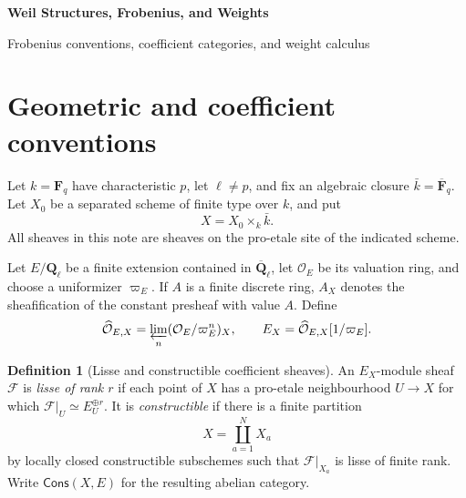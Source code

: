 \documentclass[10pt]{article}
\theoremstyle{definition}
\newtheorem{definition}[theorem]{Definition}
\newcommand{\Fq}{\mathbf F_q}
\newcommand{\Fbar}{\overline{\mathbf F}_q}
\newcommand{\Ql}{\mathbf Q_\ell}
\newcommand{\Qlb}{\overline{\mathbf Q}_\ell}
\begin{document}
\begin{center}
{\large\bfseries Weil Structures, Frobenius, and Weights\par}
\medskip
{\normalsize Frobenius conventions, coefficient categories, and weight calculus\par}
\end{center}

\begin{abstract}
This note defines every Frobenius and weight datum used in the cohomological
Weil conjectures.  It distinguishes arithmetic field Frobenius, geometric
field Frobenius, and scheme Frobenius; constructs the derived Weil category
by localizing strict equivariant complexes; and constructs algebraically
closed coefficients from finite coefficient fields.  Punctual purity,
mixedness, the BBD upper and lower predicates, scalar and base-field change,
and the monodromy filtration are then stated as a sequence of definitions
and theorems.  All derived categories are ordinary triangulated categories.
\end{abstract}
\tableofcontents

\section{Geometric and coefficient conventions}

Let \(k=\Fq\) have characteristic \(p\), let \(\ell\ne p\), and fix an
algebraic closure \(\bar k=\Fbar\).  Let \(X_0\) be a separated scheme of
finite type over \(k\), and put
\[
                         X=X_0\times_k\bar k.
\]
All sheaves in this note are sheaves on the pro-etale site of the indicated
scheme.

Let \(E/\Ql\) be a finite extension contained in \(\Qlb\), let
\(\mathcal O_E\) be its valuation ring, and choose a uniformizer
\(\varpi_E\).  If \(A\) is a finite discrete ring, \(A_X\) denotes the
sheafification of the constant presheaf with value \(A\).  Define
\[
 \widehat{\mathcal O}_{E,X}
   =\varprojlim_n(\mathcal O_E/\varpi_E^n)_X,
 \qquad
 E_X=\widehat{\mathcal O}_{E,X}[1/\varpi_E].
\]

\begin{definition}[Lisse and constructible coefficient sheaves]
An \(E_X\)-module sheaf \(\mathcal F\) is \emph{lisse of rank \(r\)} if
each point of \(X\) has a pro-etale neighbourhood \(U\to X\) for which
\(\mathcal F|_U\simeq E_U^{\oplus r}\).  It is \emph{constructible} if
there is a finite partition
\[
                       X=\coprod_{a=1}^N X_a
\]
by locally closed constructible subschemes such that
\(\mathcal F|_{X_a}\) is lisse of finite rank.  Write
\(\mathsf{Cons}(X,E)\) for the resulting abelian category.
\end{definition}
\end{document}
